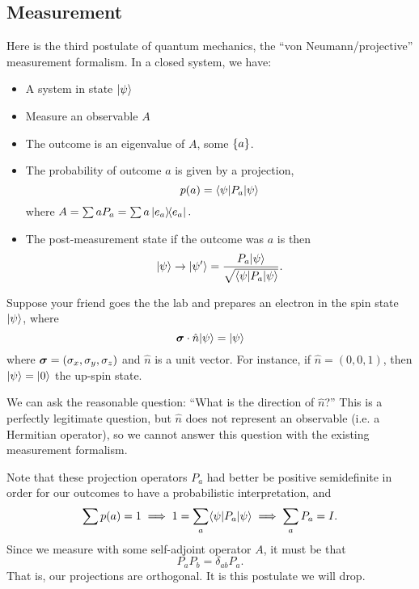 \subsection*{Measurement}
Here is the third postulate of quantum mechanics, the ``von Neumann/projective'' measurement formalism. In a closed system, we have:
\begin{itemize}
    \item A system in state $\lvert\psi\rangle$
    \item Measure an observable $A$
    \item The outcome is an eigenvalue of $A$, some $\{a\}$.
    \item The probability of outcome $a$ is given by a projection,
    \begin{equation}
        p(a)=\langle\psi\rvert P_a \lvert\psi\rangle
    \end{equation}
    where $A=\sum a P_a = \sum a \left\lvert e_a \middle\rangle\!\middle\langle e_a \right\rvert.$
    \item The post-measurement state if the outcome was $a$ is then
    \begin{equation}
        \lvert\psi\rangle\to \lvert\psi'\rangle=\frac{P_a \lvert\psi\rangle}{\sqrt{\langle\psi\rvert P_a \lvert\psi\rangle}}.
    \end{equation}
\end{itemize}
\begin{exm}
    Suppose your friend goes the the lab and prepares an electron in the spin state $\lvert\psi\rangle$, where
    \begin{equation}
        \mbox{\boldmath$ \sigma $} \cdot \hat n \lvert\psi\rangle=\lvert\psi\rangle
    \end{equation}
    where $\mbox{\boldmath$ \sigma $} =(\sigma_x,\sigma_y,\sigma_z)$ and $\hat n$ is a unit vector.
    For instance, if $\hat n=(0,0,1)$, then $\lvert\psi\rangle=\lvert0\rangle$ the up-spin state.
    
    We can ask the reasonable question: ``What is the direction of $\hat n$?'' This is a perfectly legitimate question, but $\hat n$ does not represent an observable (i.e. a Hermitian operator), so we cannot answer this question with the existing measurement formalism.
\end{exm}

Note that these projection operators $P_a$ had better be positive semidefinite in order for our outcomes to have a probabilistic interpretation, and 
\begin{equation}
    \sum p(a)=1 \implies 1 = \sum_a \langle\psi\rvert P_a \lvert\psi\rangle \implies \sum_a P_a = I.
\end{equation}
Since we measure with some self-adjoint operator $A$, it must be that
\begin{equation}
    P_a P_b = \delta_{ab} P_a.
\end{equation}
That is, our projections are orthogonal. It is this postulate we will drop.

